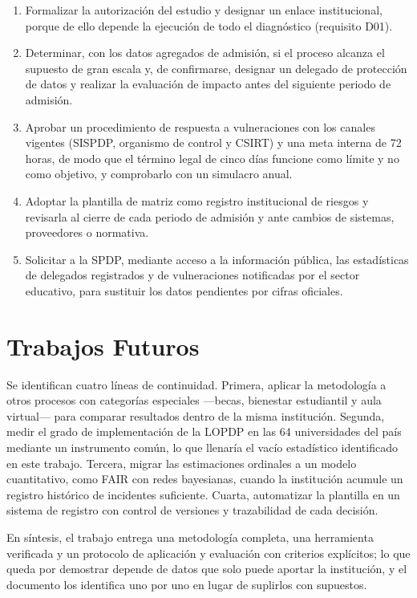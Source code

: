 \begin{enumerate}
  \item Formalizar la autorización del estudio y designar un enlace institucional, porque de ello depende la ejecución de todo el diagnóstico (requisito D01).
  \item Determinar, con los datos agregados de admisión, si el proceso alcanza el supuesto de gran escala y, de confirmarse, designar un delegado de protección de datos y realizar la evaluación de impacto antes del siguiente periodo de admisión.
  \item Aprobar un procedimiento de respuesta a vulneraciones con los canales vigentes (SISPDP, organismo de control y CSIRT) y una meta interna de 72 horas, de modo que el término legal de cinco días funcione como límite y no como objetivo, y comprobarlo con un simulacro anual.
  \item Adoptar la plantilla de matriz como registro institucional de riesgos y revisarla al cierre de cada periodo de admisión y ante cambios de sistemas, proveedores o normativa.
  \item Solicitar a la SPDP, mediante acceso a la información pública, las estadísticas de delegados registrados y de vulneraciones notificadas por el sector educativo, para sustituir los datos pendientes por cifras oficiales.
\end{enumerate}

\section{Trabajos Futuros}

Se identifican cuatro líneas de continuidad. Primera, aplicar la metodología a otros procesos con categorías especiales ---becas, bienestar estudiantil y aula virtual--- para comparar resultados dentro de la misma institución. Segunda, medir el grado de implementación de la LOPDP en las 64 universidades del país mediante un instrumento común, lo que llenaría el vacío estadístico identificado en este trabajo. Tercera, migrar las estimaciones ordinales a un modelo cuantitativo, como FAIR con redes bayesianas, cuando la institución acumule un registro histórico de incidentes suficiente. Cuarta, automatizar la plantilla en un sistema de registro con control de versiones y trazabilidad de cada decisión.

En síntesis, el trabajo entrega una metodología completa, una herramienta verificada y un protocolo de aplicación y evaluación con criterios explícitos; lo que queda por demostrar depende de datos que solo puede aportar la institución, y el documento los identifica uno por uno en lugar de suplirlos con supuestos.
